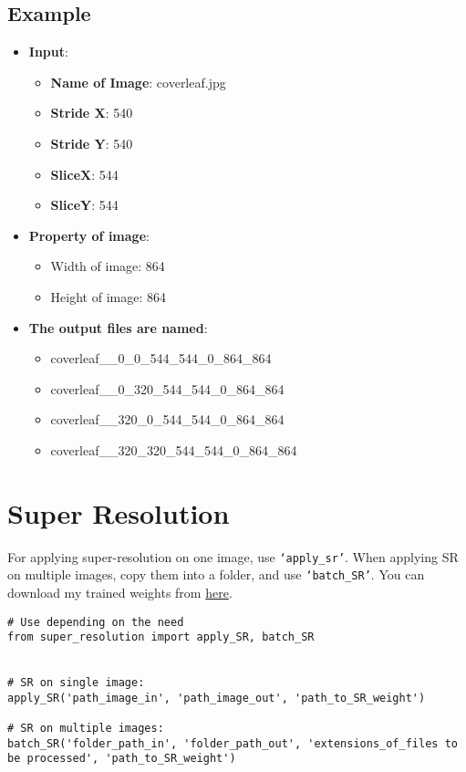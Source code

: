 \subsection*{Example}
\begin{itemize}[label={}]
  \item\textbf{Input}:
  \begin{itemize}[{\textbullet}]
    \setlength\itemsep{1mm}
    \item \textbf{Name of Image}: coverleaf.jpg
    \item \textbf{Stride X}: 540
    \item \textbf{Stride Y}: 540
    \item \textbf{SliceX}: 544
    \item \textbf{SliceY}: 544
  \end{itemize}

  \item\textbf{Property of image}:
  \begin{itemize}[{\textbullet}]
    \setlength\itemsep{1mm}
    \item Width of image: 864
    \item Height of image: 864
  \end{itemize}

  \item\textbf{The output files are named}:
  \begin{itemize}[>]
    \setlength\itemsep{1mm}
    \item coverleaf\_\_0\_0\_544\_544\_0\_864\_864
    \item coverleaf\_\_0\_320\_544\_544\_0\_864\_864
    \item coverleaf\_\_320\_0\_544\_544\_0\_864\_864
    \item coverleaf\_\_320\_320\_544\_544\_0\_864\_864
  \end{itemize}
\end{itemize}
\section{Super Resolution}
For applying super-resolution on one image, use \texttt{`apply\_sr'}. When applying SR on multiple images, copy them into a folder, and use \texttt{`batch\_SR'}. You can download my trained weights from \href{https://nautatva.github.io/btp/weight/sr}{here}.

\begin{verbatim}
# Use depending on the need
from super_resolution import apply_SR, batch_SR


# SR on single image:
apply_SR('path_image_in', 'path_image_out', 'path_to_SR_weight')

# SR on multiple images:
batch_SR('folder_path_in', 'folder_path_out', 'extensions_of_files to be processed', 'path_to_SR_weight')
\end{verbatim}


